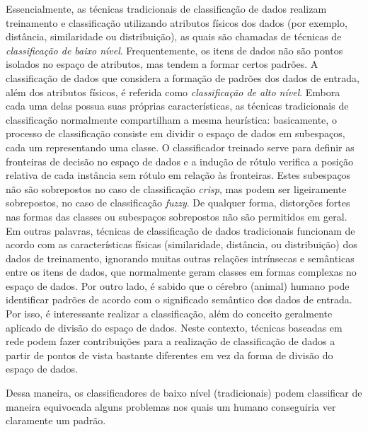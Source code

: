 \documentclass[
12pt,        %
oneside,     %
a4paper,     %
english,       %
brazil        %
%
%
]{ppgca}
\begin{document}
Essencialmente, as técnicas tradicionais de classificação de dados realizam treinamento e classificação utilizando atributos físicos dos dados (por exemplo, distância, similaridade ou distribuição), as quais são chamadas de técnicas de \textit{classificação de baixo nível}. Frequentemente, os itens de dados não são pontos isolados no espaço de atributos, mas tendem a formar certos padrões. A classificação de dados que considera a formação de padrões dos dados de entrada, além dos atributos físicos, é referida como\textit{ classificação de alto nível}.
Embora cada uma delas possua suas próprias características, as técnicas tradicionais de classificação normalmente compartilham a mesma heurística: basicamente, o processo de classificação consiste em dividir o espaço de dados em subespaços, cada um representando uma classe. O classificador treinado serve para definir as fronteiras de decisão no espaço de dados e a indução de rótulo verifica a posição relativa de cada instância sem rótulo em relação às fronteiras. Estes subespaços não são sobrepostos no caso de classificação \textit{crisp}, mas podem ser ligeiramente sobrepostos, no caso de classificação \textit{fuzzy}. De qualquer forma, distorções fortes nas formas das classes ou subespaços sobrepostos não são permitidos em geral. Em outras palavras, técnicas de classificação de dados tradicionais funcionam de acordo com as características físicas (similaridade, distância, ou distribuição) dos dados de treinamento, ignorando muitas outras relações intrínsecas e semânticas entre os itens de dados, que normalmente geram classes em formas complexas no espaço de dados. Por outro lado, é sabido que o cérebro (animal) humano pode identificar padrões de acordo com o significado semântico dos dados de entrada. Por isso, é interessante realizar a classificação, além do conceito geralmente aplicado de divisão do espaço de dados. Neste contexto, técnicas baseadas em rede podem fazer contribuições para a realização de classificação de dados a partir de pontos de vista bastante diferentes em vez da forma de divisão do espaço de dados.
 
Dessa maneira, os classificadores de baixo nível (tradicionais) podem classificar de maneira equivocada alguns problemas nos quais um humano conseguiria ver claramente um padrão.
\end{document}
